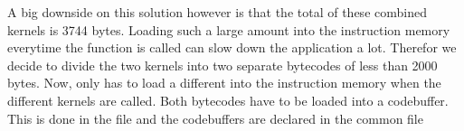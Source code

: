 A big downside on this solution however is that the total  of these combined kernels is 3744 bytes. Loading such a large amount into the instruction memory everytime the function is called can slow down the application a lot. Therefor we decide to divide the two kernels into two separate bytecodes of less than 2000 bytes. Now,  only has to load a different  into the instruction memory when the different kernels are called. Both bytecodes have to be loaded into a codebuffer. This is done in the  file and the codebuffers are declared in the common file 